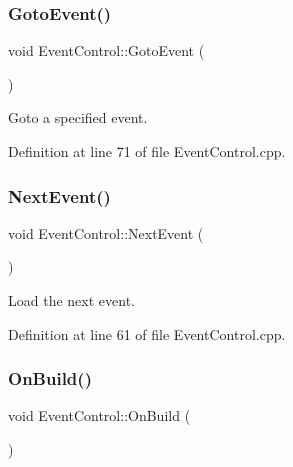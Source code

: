 \subsubsection{\texorpdfstring{Goto\+Event()}{GotoEvent()}}
{\footnotesize\ttfamily void Event\+Control\+::\+Goto\+Event (\begin{DoxyParamCaption}{ }\end{DoxyParamCaption})\hspace{0.3cm}{\ttfamily [virtual]}}



Goto a specified event. 



Definition at line 71 of file Event\+Control.\+cpp.

\hypertarget{class_d_d4hep_1_1_event_control_ac176e09a639beea7cc010b5f66b7b129}{}\label{class_d_d4hep_1_1_event_control_ac176e09a639beea7cc010b5f66b7b129} 
\subsubsection{\texorpdfstring{Next\+Event()}{NextEvent()}}
{\footnotesize\ttfamily void Event\+Control\+::\+Next\+Event (\begin{DoxyParamCaption}{ }\end{DoxyParamCaption})\hspace{0.3cm}{\ttfamily [virtual]}}



Load the next event. 



Definition at line 61 of file Event\+Control.\+cpp.

\hypertarget{class_d_d4hep_1_1_event_control_ada9bb8f5e290f6acb6832208f407a53a}{}\label{class_d_d4hep_1_1_event_control_ada9bb8f5e290f6acb6832208f407a53a} 
\subsubsection{\texorpdfstring{On\+Build()}{OnBuild()}}
{\footnotesize\ttfamily void Event\+Control\+::\+On\+Build (\begin{DoxyParamCaption}{ }\end{DoxyParamCaption})\hspace{0.3cm}{\ttfamily [virtual]}}



